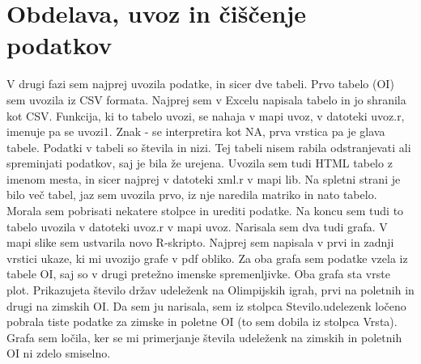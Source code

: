\documentclass[11pt,a4paper]{article}
\begin{document}
\section{Obdelava, uvoz in čiščenje podatkov}
V drugi fazi sem najprej uvozila podatke, in sicer dve tabeli. Prvo tabelo (OI) sem uvozila iz CSV formata. Najprej sem v Excelu napisala tabelo in jo shranila kot CSV. Funkcija, ki to tabelo uvozi, se nahaja v mapi uvoz, v datoteki uvoz.r, imenuje pa se uvozi1. Znak - se interpretira kot NA, prva vrstica pa je glava tabele. Podatki v tabeli so števila in nizi. Tej tabeli nisem rabila odstranjevati  ali spreminjati podatkov, saj je bila že urejena.
Uvozila sem tudi HTML tabelo z imenom mesta, in sicer najprej v datoteki xml.r v mapi lib. Na spletni strani je bilo več tabel, jaz sem uvozila prvo, iz nje naredila matriko in nato tabelo. Morala sem pobrisati nekatere stolpce in urediti podatke. Na koncu sem tudi to tabelo uvozila v datoteki uvoz.r v mapi uvoz.
Narisala sem dva tudi grafa. V mapi slike sem ustvarila novo R-skripto. Najprej sem napisala v prvi in zadnji vrstici ukaze, ki mi uvozijo grafe v pdf obliko. Za oba grafa sem podatke vzela iz tabele OI, saj so v drugi pretežno imenske spremenljivke.
Oba grafa sta vrste plot. Prikazujeta število držav udeleženk na Olimpijskih igrah, prvi na poletnih in drugi na zimskih OI. Da sem ju narisala, sem iz stolpca Stevilo.udelezenk ločeno pobrala tiste podatke za zimske in poletne OI (to sem dobila iz stolpca Vrsta). Grafa sem ločila, ker se mi primerjanje števila udeleženk na zimskih in poletnih OI ni zdelo smiselno.
 



% 
% 
% 
\end{document}
